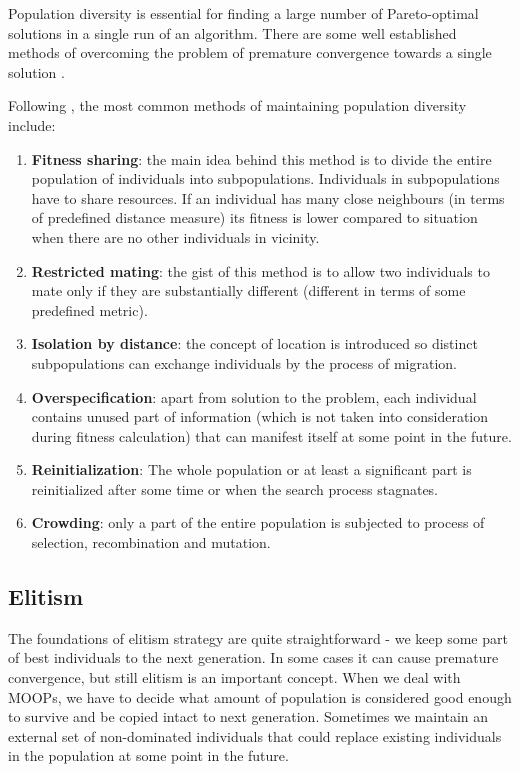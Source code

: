 Population diversity is essential for finding a large number of Pareto-optimal solutions in a single run of an algorithm.
There are some well established methods of overcoming the problem of premature convergence towards a single solution \cite{Phd}. 

Following \cite{Phd}, the most common methods of maintaining population diversity include:

\begin{enumerate}

  \item \textbf{Fitness sharing}:
	the main idea behind this method is to divide the entire population of individuals into subpopulations.
	Individuals in subpopulations have to share resources.
	If an individual has many close neighbours (in terms of predefined distance measure) its fitness is lower compared to situation when there are
	no other individuals in vicinity. 
	
  \item \textbf{Restricted mating}:
	the gist of this method is to allow two individuals to mate only if they are substantially different (different in terms of some predefined metric).
  \item \textbf{Isolation by distance}:
	the concept of location is introduced so distinct subpopulations can exchange individuals by the process of migration. 
  \item \textbf{Overspecification}:
	apart from solution to the problem, each individual contains unused part of information (which is not taken into consideration during fitness calculation)
	that can manifest itself at some point in the future.
  \item \textbf{Reinitialization}:
	The whole population or at least a significant part is reinitialized after some time or when the search process stagnates.
  \item \textbf{Crowding}:
	only a part of the entire population is subjected to process of selection, recombination and mutation. 
\end{enumerate}

\subsection{Elitism}

The foundations of elitism strategy are quite straightforward - we keep some part of best individuals to the next generation.
In some cases it can cause premature convergence, but still elitism is an important concept.
When we deal with MOOPs, we have to decide what amount of population is considered good enough to survive and be copied intact to next generation.
Sometimes we maintain an external set of non-dominated individuals that could replace existing individuals in the population at some point in the future.
   
